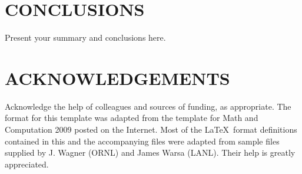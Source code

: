 \documentclass{physor2012}
\begin{document}
\section{CONCLUSIONS}
%
Present your summary and conclusions here.
%
\section*{ACKNOWLEDGEMENTS}
%
Acknowledge the help of colleagues and sources of funding, as appropriate.
%
The format for this template was adapted from the template for Math and Computation 2009 
posted on the Internet.  Most of the \LaTeX\ format definitions contained
in this and the accompanying files were adapted from sample files supplied 
by J. Wagner (ORNL) and James Warsa (LANL). Their help is greatly appreciated.

%
\setlength{\baselineskip}{12pt}


\end{document}
